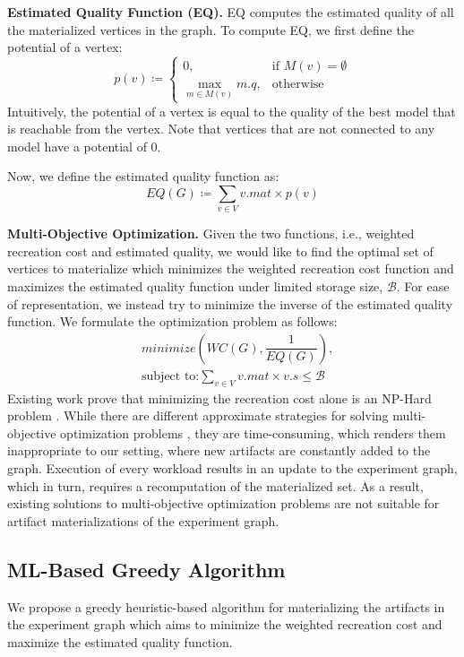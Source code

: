 \textbf{Estimated Quality Function (EQ).} 
EQ computes the estimated quality of all the materialized vertices in the graph.
To compute EQ, we first define the potential of a vertex:
\[
p(v) \coloneqq  
		\begin{cases}
		0 , & \text{if }M(v) = \emptyset  \\
		\max\limits_{m \in M(v)} m.q, & \text{otherwise}
		\end{cases}
\]
Intuitively, the potential of a vertex is equal to the quality of the best model that is reachable from the vertex.
Note that vertices that are not connected to any model have a potential of 0.

Now, we define the estimated quality function as:
\[
EQ(G) \coloneqq  \sum\limits_{v \in V}  v.mat \times p(v)
\]

\textbf{Multi-Objective Optimization.}
Given the two functions, i.e., weighted recreation cost and estimated quality, we would like to find the optimal set of vertices to materialize which minimizes the weighted recreation cost function and maximizes the estimated quality function under limited storage size, $\mathcal{B}$.
For ease of representation, we instead try to minimize the inverse of the estimated quality function.
We formulate the optimization problem as follows:
\begin{equation}
\begin{split}
& minimize(WC(G), \dfrac{1}{EQ(G)}), \\
& \text{subject to:} \sum\limits_{v \in V} v.mat \times v.s \leq \mathcal{B}
\end{split}
\end{equation}
Existing work prove that minimizing the recreation cost alone is an NP-Hard problem \cite{bhattacherjee2015principles}.
While there are different approximate strategies for solving multi-objective optimization problems \cite{coello2007evolutionary}, they are time-consuming, which renders them inappropriate to our setting, where new artifacts are constantly added to the graph.
Execution of every workload results in an update to the experiment graph, which in turn, requires a recomputation of the materialized set.
As a result, existing solutions to multi-objective optimization problems are not suitable for artifact materializations of the experiment graph.

\subsection{ML-Based Greedy Algorithm}\label{subsec-ml-based-materialization}
We propose a greedy heuristic-based algorithm for materializing the artifacts in the experiment graph which aims to minimize the weighted recreation cost and maximize the estimated quality function.

